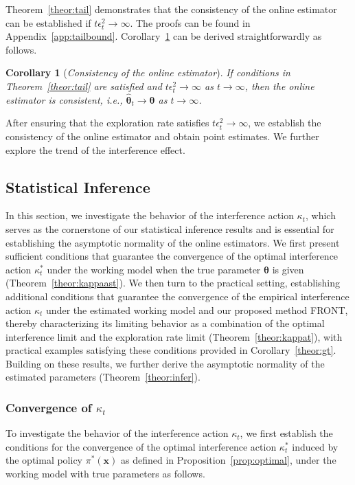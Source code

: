 \documentclass[12pt]{article}
\newtheorem{corollary}[theorem]{Corollary}
\begin{document}
Theorem~\ref{theor:tail} demonstrates that the consistency of the online estimator can be established if $t\epsilon_t^2 \to \infty$. The proofs can be found in Appendix~\ref{app:tailbound}. Corollary~\ref{coro:consistency} can be derived straightforwardly as follows.

\begin{corollary} [{\emph{Consistency of the online estimator}}]
\label{coro:consistency}
If conditions in Theorem~\ref{theor:tail} are satisfied and $t\epsilon_t^2 \to \infty$ as $t \to \infty$, then the online estimator is consistent, i.e., $\widehat{\bm{\theta}}_{t} \to \bm{\theta}$ as $t \to \infty$.
\end{corollary}
After ensuring that the exploration rate satisfies $t\epsilon_t^2 \to \infty$, we establish the consistency of the online estimator and obtain point estimates. We further explore the trend of the interference effect.

\subsection{Statistical Inference} 
\label{sec:infer}

In this section, we investigate the behavior of the interference action $\kappa_t$, which serves as the cornerstone of our statistical inference results and is essential for establishing the asymptotic normality of the online estimators. We first present sufficient conditions that guarantee the convergence of the optimal interference action $\kappa_t^\ast$ under the working model when the true parameter $\bm{\theta}$ is given (Theorem~\ref{theor:kappaast}). We then turn to the practical setting, establishing additional conditions that guarantee the convergence of the empirical interference action $\kappa_t$ under the estimated working model and our proposed method FRONT, thereby characterizing its limiting behavior as a combination of the optimal interference limit and the exploration rate limit (Theorem~\ref{theor:kappat}), with practical examples satisfying these conditions provided in Corollary~\ref{theor:gt}.
Building on these results, we further derive the asymptotic normality of the estimated parameters (Theorem~\ref{theor:infer}).


\subsubsection{Convergence of $\kappa_t$}
\label{sec:kappat}
To investigate the behavior of the interference action $\kappa_t$, we first establish the conditions for the convergence of the optimal interference action $\kappa_t^\ast$ induced by the optimal policy $\pi^\ast(\bm{x})$ as defined in Proposition~\ref{prop:optimal}, under the working model with true parameters as follows.
\end{document}
